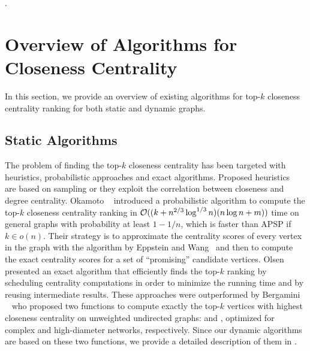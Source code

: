 .

\section{Overview of Algorithms for Closeness Centrality}
%
In this section, we provide an overview of existing algorithms for top-$k$
closeness centrality ranking for both static and dynamic graphs.


\subsection{Static Algorithms}
%
The problem of finding the top-$k$ closeness centrality has been targeted
with heuristics, probabilistic approaches and exact algorithms.
Proposed heuristics~\cite{lim2011online,DBLP:journals/ipl/MerrerST14} are based
on sampling or they exploit the correlation between closeness and degree
centrality.
%
Okamoto \etal~\cite{DBLP:conf/faw/OkamotoCL08} introduced a probabilistic algorithm
to compute the top-$k$ closeness centrality ranking in
$\mathcal{O}((k + n^{2/3}\log^{1/3}n)(n\log n + m))$ time on general graphs
with probability at least $1 - 1/n$, which is faster than APSP if $k \in o(n)$.
Their strategy is to approximate the centrality scores of every vertex in the graph
with the algorithm by Eppstein and Wang~\cite{DBLP:journals/jgaa/EppsteinW04}
and then to compute the exact centrality scores for a set of \enquote{promising}
candidate vertices.
%
Olsen \etal~\cite{DBLP:conf/icde/OlsenLH14} presented an exact algorithm that efficiently
finds the top-$k$ ranking by scheduling centrality computations in order to minimize the
running time and by reusing intermediate results.
%
These approaches were outperformed by Bergamini
\etal~\cite{DBLP:journals/tkdd/BergaminiBCMM19} who proposed two functions to compute
exactly the top-$k$ vertices with highest closeness centrality on unweighted
undirected graphs:
\nbcut and \nbbound, optimized for complex and high-diameter networks,
respectively. Since our dynamic algorithms are based on these two functions, we
provide a detailed description of them in .

